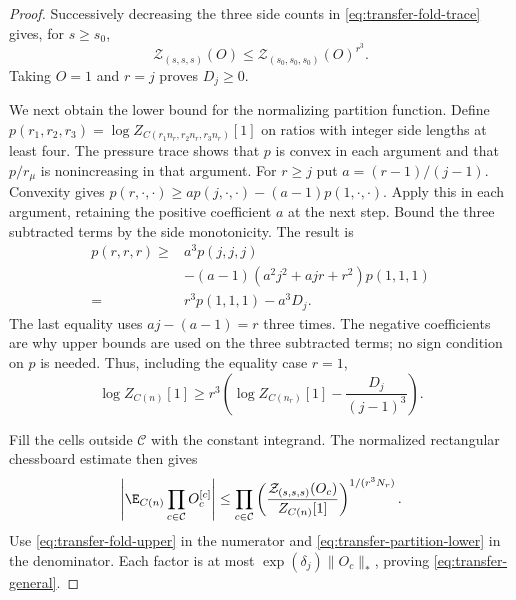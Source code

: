 \begin{proof}
Successively decreasing the three side counts in
\eqref{eq:transfer-fold-trace} gives, for $s\ge s_0$,
\begin{equation}\label{eq:transfer-fold-upper}
 \mathcal Z_{(s,s,s)}(O)
            \le\mathcal Z_{(s_0,s_0,s_0)}(O)^{r^3}.
\end{equation}
Taking $O=1$ and $r=j$ proves $D_j\ge0$.

We next obtain the lower bound for the normalizing partition
function. Define
$p(r_1,r_2,r_3)=\log Z_{C(r_1n_r,r_2n_r,r_3n_r)}[1]$
on ratios with integer side lengths at least four.
The pressure trace \cite[(75)]{ChamberLattice} shows that
$p$ is convex in each argument and that $p/r_\mu$ is
nonincreasing in that argument. For $r\ge j$ put
$a=(r-1)/(j-1)$. Convexity gives
$p(r,\cdot,\cdot)\ge a p(j,\cdot,\cdot)
-(a-1)p(1,\cdot,\cdot)$.
Apply this in each argument, retaining the positive coefficient
$a$ at the next step. Bound the three subtracted terms by the
side monotonicity. The result is
\begin{align*}
 p(r,r,r)\ge{}&
 a^3p(j,j,j)\\
 &-(a-1)(a^2j^2+ajr+r^2)p(1,1,1)\\
 ={}&r^3p(1,1,1)-a^3D_j.
\end{align*}
The last equality uses $aj-(a-1)=r$ three times.
The negative coefficients are why upper bounds are used on
the three subtracted terms; no sign condition on $p$ is needed.
Thus, including the equality case $r=1$,
\begin{equation}\label{eq:transfer-partition-lower}
 \log Z_{C(n)}[1]\ge
 r^3\left(\log Z_{C(n_r)}[1]-\frac{D_j}{(j-1)^3}\right).
\end{equation}

Fill the cells outside $\mathcal C$ with the constant integrand.
The normalized rectangular chessboard estimate then gives
\[
 \left|\E_{C(n)}\prod_{c\in\mathcal C}O_c^{[c]}\right|
 \le\prod_{c\in\mathcal C}
       \left(\frac{\mathcal Z_{(s,s,s)}(O_c)}
                         {Z_{C(n)}[1]}\right)^{1/(r^3N_r)}.
\]
Use \eqref{eq:transfer-fold-upper} in the numerator and
\eqref{eq:transfer-partition-lower} in the denominator.
Each factor is at most $\exp(\delta_j)\|O_c\|_*$, proving
\eqref{eq:transfer-general}.
\end{proof}

